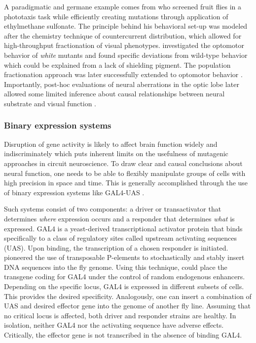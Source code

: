 A paradigmatic and germane example comes from \citet{Benzer:1967aa} who screened fruit flies in a phototaxis task while efficiently creating mutations through application of ethylmethane sulfonate. The principle behind his behavioral set-up was modeled after the chemistry technique of countercurrent distribution, which allowed for high-throughput fractionation of visual phenotypes. \citet{Gotz:1964bj} investigated the optomotor behavior of \textit{white} mutants and found specific deviations from wild-type behavior which could be explained from a lack of shielding pigment. The population fractionation approach was later successfully extended to optomotor behavior \citep{Goetz:1970aa}. Importantly, post-hoc evaluations of neural aberrations in the optic lobe later allowed some limited inference about causal relationships between neural substrate and visual function \citep{Pak:1970aa,Heisenberg:1975aa,Heisenberg:1978aa,Fischbach:1981aa}.

\subsubsection{Binary expression systems}
Disruption of gene activity is likely to affect brain function widely and indiscriminately which puts inherent limits on the usefulness of mutagenic approaches in circuit neuroscience. To draw clear and causal conclusions about neural function, one needs to be able to flexibly manipulate groups of cells with high precision in space and time. This is generally accomplished through the use of binary expression systems like GAL4-UAS \citep{Venken:2011hf}.

Such systems consist of two components: a driver or transactivator that determines \textit{where} expression occurs and a responder that determines \textit{what} is expressed. GAL4 is a yeast-derived transcriptional activator protein that binds specifically to a class of regulatory sites called upstream activating sequences (UAS). Upon binding, the transcription of a chosen responder is initiated. \citet{Rubin:1982aa} pioneered the use of transposable P-elements to stochastically and stably insert DNA sequences into the fly genome. Using this technique, \citet{Brand:1993vw} could place the transgene coding for GAL4 under the control of random endogenous enhancers. Depending on the specific locus, GAL4 is expressed in different subsets of cells. This provides the desired specificity. Analogously, one can insert a combination of UAS and desired effector gene into the genome of another fly line. Assuming that no critical locus is affected, both driver and responder strains are healthy. In isolation, neither GAL4 nor the activating sequence have adverse effects. Critically, the effector gene is not transcribed in the absence of binding GAL4.

